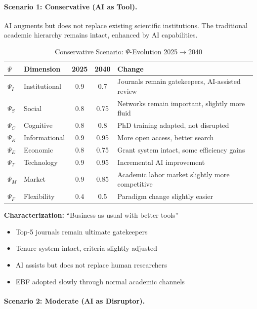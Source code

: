 \paragraph{Scenario 1: Conservative (AI as Tool).}

AI augments but does not replace existing scientific institutions. The traditional
academic hierarchy remains intact, enhanced by AI capabilities.

\begin{table}[htbp]
\centering
\caption{Conservative Scenario: $\Psi$-Evolution 2025$\to$2040}
\label{tab:scenario-conservative}
\renewcommand{\arraystretch}{1.2}
\small
\begin{tabular}{@{}llccp{5cm}@{}}
\toprule
$\Psi$ & \textbf{Dimension} & \textbf{2025} & \textbf{2040} & \textbf{Change} \\
\midrule
$\Psi_I$ & Institutional & 0.9 & 0.7 & Journals remain gatekeepers, AI-assisted review \\
$\Psi_S$ & Social & 0.8 & 0.75 & Networks remain important, slightly more fluid \\
$\Psi_C$ & Cognitive & 0.8 & 0.8 & PhD training adapted, not disrupted \\
$\Psi_K$ & Informational & 0.9 & 0.95 & More open access, better search \\
$\Psi_E$ & Economic & 0.8 & 0.75 & Grant system intact, some efficiency gains \\
$\Psi_T$ & Technology & 0.9 & 0.95 & Incremental AI improvement \\
$\Psi_M$ & Market & 0.9 & 0.85 & Academic labor market slightly more competitive \\
$\Psi_F$ & Flexibility & 0.4 & 0.5 & Paradigm change slightly easier \\
\bottomrule
\end{tabular}
\end{table}

\textbf{Characterization:} ``Business as usual with better tools''
\begin{itemize}[nosep]
    \item Top-5 journals remain ultimate gatekeepers
    \item Tenure system intact, criteria slightly adjusted
    \item AI assists but does not replace human researchers
    \item EBF adopted slowly through normal academic channels
\end{itemize}

\paragraph{Scenario 2: Moderate (AI as Disruptor).}

